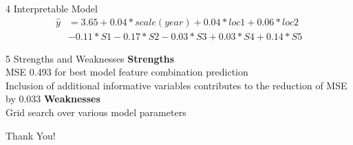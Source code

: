 \documentclass[10pt]{beamer}
\begin{document}
\begin{frame}{4 Interpretable Model}
$$
\begin{aligned}
\hat{y} &=3.65+0.04* scale(year)+0.04*loc1+0.06*loc2\\
&-0.11*S1-0.17*S2-0.03*S3+0.03*S4+0.14*S5
\end{aligned}
$$


\end{frame}


\begin{frame}{5 Strengths and Weaknesses}
\textbf{Strengths} \\
MSE 0.493 for best model feature combination prediction\\
 Inclusion of additional informative variables contributes to the reduction of MSE by 0.033
 \newline
 \newline
\textbf{Weaknesses}\\
Grid search over various model parameters 
\end{frame}

\begin{frame}
\Huge{\centerline{Thank You!}}
\end{frame}
\end{document}
